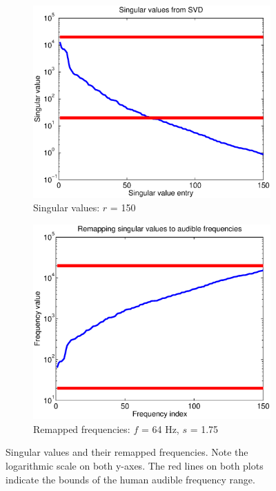 \documentclass[11pt]{article}
\begin{document}
\begin{figure}
	\begin{subfigure}[h]{0.5\textwidth}
		\includegraphics[width=\textwidth]{figures/singulars.eps}
		\caption{Singular values: $r$ = 150} 
		\label{fig:singulars}
	\end{subfigure}
	\begin{subfigure}[h]{0.5\textwidth}
		\includegraphics[width=\textwidth]{figures/remap_freqs.eps}
		\caption{Remapped frequencies: $f$ = 64 Hz, $s$ = 1.75}
		\label{fig:freqs}
	\end{subfigure}
	\caption{Singular values and their remapped frequencies. Note the logarithmic scale on both y-axes. The red lines on both plots indicate the bounds of the human audible frequency range.}
\end{figure}
\end{document}
